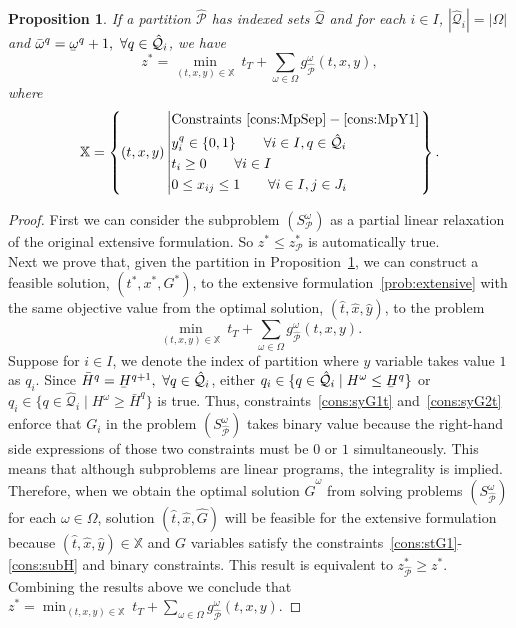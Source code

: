 \documentclass[11pt]{article}
\newtheorem{proposition}[theorem]{Proposition}
\renewcommand{\underbar}{\underaccent{\bar}}
\begin{document}
	\begin{proposition} \label{prop:finestPar}
		If a partition \(\hat{\mathcal{P}}\) has indexed sets \(\hat{\mathcal{Q}}\) and for each \(i \in I\), \(|\hat{\mathcal{Q}}_i| = |\Omega|\) and \(\bar{\omega}^q = \underbar{\omega}^q + 1,\ \forall q \in \hat{\mathcal{Q}}_i\), we have \[z^* = \min_{(t,x,y) \in \mathbb{X}}\ t_T + \sum_{\omega \in \Omega} g^\omega_{\hat{\mathcal{P}}}(t,x,y),\]
		where 
		\begin{equation*}
			\mathbb{X} = \left\{(t,x,y) \left| 
			\begin{aligned}
			& \text{Constraints } \eqref{cons:MpSep}-\eqref{cons:MpY1}\\ 
			&y_i^q \in \{0,1\} \qquad \forall i \in I, q \in \hat{\mathcal{Q}}_i\\
			& t_i \geq 0 \qquad \forall i \in I\\
			& 0 \leq x_{ij} \leq 1 \qquad \forall i \in I, j \in J_i
			\end{aligned}
			\right. \right\}.
		\end{equation*}
	\end{proposition}
	\begin{proof}
		First we can consider the subproblem \((S_\mathcal{P}^\omega)\) as a partial linear relaxation of the original extensive formulation. So \(z^* \leq z^*_\mathcal{P}\) is automatically true.\\
		\newline
		Next we prove that, given the partition in Proposition~\ref{prop:finestPar}, we can construct a feasible solution, \((t^*,x^*,G^*)\), to the extensive formulation~\eqref{prob:extensive} with the same objective value from the optimal solution, \((\hat{t},\hat{x},\hat{y})\), to the problem
		\[\min_{(t,x,y) \in \mathbb{X}}\ t_T + \sum_{\omega \in \Omega} g^\omega_{\hat{\mathcal{P}}}(t,x,y).\]
		Suppose for \(i \in I\), we denote the index of partition where \(y\) variable takes value \(1\) as \(q_i\). Since \(\bar{H}^q = \underbar{H}^{q + 1},\ \forall q \in \hat{\mathcal{Q}}_i\), either \(q_i \in \{q \in \hat{\mathcal{Q}}_i \mid H^\omega \leq \underbar{H}^q\}\) or \(q_i \in \{q \in \hat{\mathcal{Q}}_i \mid H^\omega \geq \bar{H}^q\}\) is true. Thus, constraints~\eqref{cons:syG1t} and~\eqref{cons:syG2t} enforce that \(G_i\) in the problem \((S_{\hat{\mathcal{P}}}^\omega)\) takes binary value because the right-hand side expressions of those two constraints must be \(0\) or \(1\) simultaneously. This means that although subproblems are linear programs, the integrality is implied. Therefore, when we obtain the optimal solution \(\hat{G}^\omega\) from solving problems \((S_{\hat{\mathcal{P}}}^\omega)\) for each \(\omega \in \Omega\), solution \((\hat{t},\hat{x},\hat{G})\) will be feasible for the extensive formulation because \((\hat{t},\hat{x},\hat{y}) \in \mathbb{X}\) and \(G\) variables satisfy the constraints~\eqref{cons:stG1}-\eqref{cons:subH} and binary constraints. This result is equivalent to \(z_{\hat{\mathcal{P}}}^* \geq z^*\). Combining the results above we conclude that \(z^* = \min_{(t,x,y) \in \mathbb{X}}\ t_T + \sum_{\omega \in \Omega} g^\omega_{\hat{\mathcal{P}}}(t,x,y).\)
	\end{proof}
\end{document}

